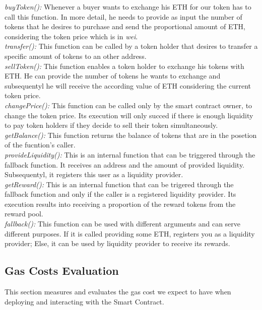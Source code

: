 \documentclass[12pt,a4paper]{article}
\begin{document}
\emph{buyToken():} Whenever a buyer wants to exchange his ETH for our token has
to call this function. In more detail, he needs to provide as input the number
of tokens that he desires to purchase and send the proportional amount of ETH,
considering the token price which is in \emph{wei}.\\

\emph{transfer():} This function can be called by a token holder that desires to
transfer a specific amount of tokens to an other address.\\

\emph{sellToken():} This function enables a token holder to exchange his tokens
with ETH. He can provide the number of tokens he wants to exchange and
subsequentyl he will receive the according value of ETH considering the current
token price.\\

\emph{changePrice():} This function can be called only by the smart contract
owner, to change the token price. Its execution will only succed if there is
enough liquidity to pay token holders if they decide to sell their token
simultaneously.\\

\emph{getBalance():} This function returns the balance of tokens that are in the
posetion of the fucntion's caller.\\

\emph{provideLiquidity():} This is an internal function that can be triggered
through the fallback function. It receives an address and the amount of provided
liquidity. Subsequentyl, it registers this user as a liquidity provider. \\

\emph{getReward():} This is an internal function that can be trigered through
the fallback function and only if the caller is a registered liquidity provider.
Its execution results into receiving a proportion of the reward tokens from the
reward pool.\\

\emph{fallback():} This function can be used with different arguments and can
serve different purposes. If it is called providing some ETH, registers you as a
liquidity provider; Else, it can be used by liquidity provider to receive its
rewards.\\



\subsection*{Gas Costs Evaluation}
This section measures and evaluates the gas cost we expect to have when deploying and
interacting with the Smart Contract. \\
\end{document}
